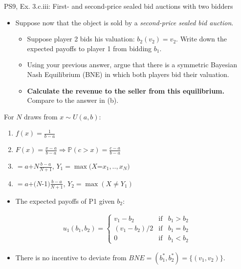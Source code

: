 \begin{frame}{PS9, Ex. 3.c.iii: First- and second-price sealed bid auctions with two bidders}
    \begin{multicols}{2}
      \begin{itemize}
        \item[(c)] Suppose now that the object is sold by a \textit{second-price sealed bid auction}.
        \begin{itemize}\normalsize
          \item[i.]   Suppose player 2 bids his valuation: $b_2(v_2) = v_2$. Write down the expected payoffs to player 1 from bidding $b_1$.
          \item[ii.]  Using your previous answer, argue that there is a symmetric Bayesian Nash Equilibrium (BNE) in which both players bid their valuation.
          \item[iii.] \textbf{Calculate the revenue to the seller from this equilibrium.} Compare to the answer in (b).
        \end{itemize}
      \end{itemize}
      For $N$ draws from $x\sim U(a, b):$
      \vspace{-6pt}
      \begin{enumerate}
        \item[PDF:] $f(x)=\frac{1}{b-a}$
        \item[CDF:] $F(x)=\frac{x-a}{b-a}\Rightarrow\mathbb{P}(c>x)=\frac{c-a}{b-a}$
        \item[$\mathbb{E}(Y_1)$] $=a$+$N\frac{b-a}{N+1}$, $Y_1=\max(X$=$x_1,..,x_N)$
        \item[$\mathbb{E}(Y_2)$] $=a$+$(N$-1$)\frac{b-a}{N+1}$, $Y_2=\max(X\neq Y_1)$
      \end{enumerate}
      \vfill\null\columnbreak
      \begin{itemize}
        \item[(i)] The expected payoffs of P1 given $b_2$:
      \end{itemize}
      \vspace{-16pt}
      \begin{align*}
        u_1(b_1,b_2)=\left\{\begin{array}{lcl}
          v_1-b_2     & \text{if} & b_1>b_2 \\
          (v_1-b_2)/2 & \text{if} & b_1=b_2 \\
          0           & \text{if} & b_1<b_2
        \end{array}\right.
      \end{align*}
      \vspace{-18pt}
      \begin{itemize}
        \item[(ii)] There is no incentive to deviate from $BNE=(b_1^*,b_2^*)=\{(v_1,v_2)\}$.
      \end{itemize}
      \vfill\null
    \end{multicols}
\end{frame}
